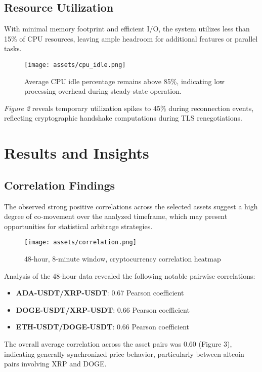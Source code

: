 \documentclass{article}
\begin{document}
\subsection{Resource Utilization}
With minimal memory footprint and efficient I/O, the system utilizes less than 15\% of CPU resources, leaving ample headroom for additional features or parallel tasks.
\begin{figure}[H]
  \centering
  \texttt{[image: assets/cpu\_idle.png]}
  \caption{Average CPU idle percentage remains above 85\%, indicating low processing overhead during steady-state operation.}
\end{figure}

\textit{Figure 2} reveals temporary utilization spikes to 45\% during reconnection events, reflecting cryptographic handshake computations during TLS renegotiations. \newpage

\section{Results and Insights}

\subsection{Correlation Findings} The observed strong positive correlations across the selected assets suggest a high degree of co-movement over the analyzed timeframe, which may present opportunities for statistical arbitrage strategies.

\begin{figure}[h] \centering \texttt{[image: assets/correlation.png]} \caption{48-hour, 8-minute window, cryptocurrency correlation heatmap} \end{figure}

Analysis of the 48-hour data revealed the following notable pairwise correlations: \begin{itemize} \item \textbf{ADA-USDT/XRP-USDT}: 0.67 Pearson coefficient \item \textbf{DOGE-USDT/XRP-USDT}: 0.66 Pearson coefficient \item \textbf{ETH-USDT/DOGE-USDT}: 0.66 Pearson coefficient \end{itemize}

The overall average correlation across the asset pairs was 0.60 (Figure 3), indicating generally synchronized price behavior, particularly between altcoin pairs involving XRP and DOGE.
\end{document}
